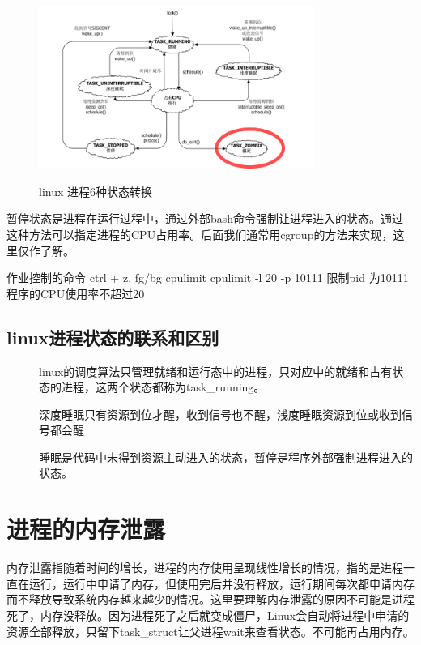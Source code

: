 \begin{figure}[H]
 \wdfigbox
  {\caption{linux 进程6种状态转换}\label{linux_process_6types}}
  {
  \includegraphics[width=9cm]{./figure/linux_process_6types.png}
  }
\end{figure}
暂停状态是进程在运行过程中，通过外部bash命令强制让进程进入的状态。通过这种方法可以指定进程的CPU占用率。后面我们通常用cgroup的方法来实现，这里仅作了解。
\begin{latexcmd}[label=进入stop状态的方法]
作业控制的命令
ctrl + z, fg/bg
cpulimit
cpulimit -l 20 -p 10111
限制pid 为10111程序的CPU使用率不超过20%
\end{latexcmd}
\subsection{linux进程状态的联系和区别}
\begin{description}
  \item[{}] linux的调度算法只管理就绪和运行态中的进程，只对应\label{linux_process_6types}中的就绪和占有状态的进程，这两个状态都称为task\_running。
  \item[{}] 深度睡眠只有资源到位才醒，收到信号也不醒，浅度睡眠资源到位或收到信号都会醒
  \item[{}] 睡眠是代码中未得到资源主动进入的状态，暂停是程序外部强制进程进入的状态。
\end{description}


\section{进程的内存泄露}
内存泄露指随着时间的增长，进程的内存使用呈现线性增长的情况，指的是进程一直在运行，运行中申请了内存，但使用完后并没有释放，运行期间每次都申请内存而不释放导致系统内存越来越少的情况。这里要理解内存泄露的原因不可能是进程死了，内存没释放。因为进程死了之后就变成僵尸，Linux会自动将进程中申请的资源全部释放，只留下task\_struct让父进程wait来查看状态。不可能再占用内存。
